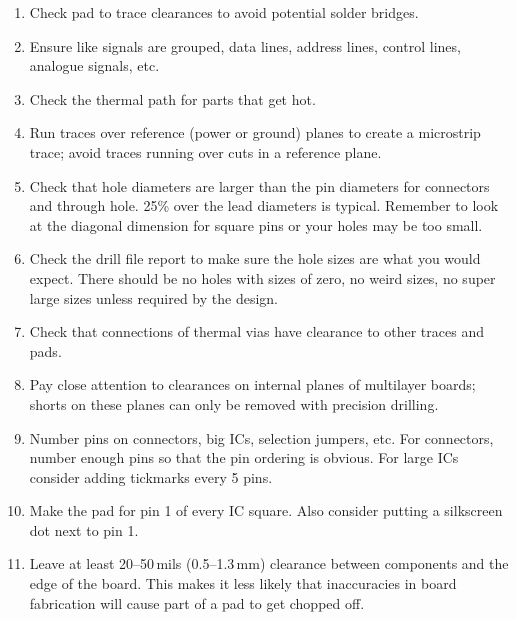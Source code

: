 \begin{enumerate}
\item Check pad to trace clearances to avoid potential solder bridges.


\item Ensure like signals are grouped, data lines, address lines, control lines, analogue signals, etc.

\item Check the thermal path for parts that get hot.

\item Run traces over reference (power or ground) planes to create a
  microstrip trace; avoid traces running over cuts in a reference
  plane.

\item Check that hole diameters are larger than the pin diameters for
  connectors and through hole. 25\% over the lead diameters is
  typical.  Remember to look at the diagonal dimension for square pins
  or your holes may be too small.

\item Check the drill file report to make sure the hole sizes are what
  you would expect. There should be no holes with sizes of zero, no
  weird sizes, no super large sizes unless required by the design.

\item Check that connections of thermal vias have clearance to other
  traces and pads.

\item Pay close attention to clearances on internal planes of
  multilayer boards; shorts on these planes can only be removed with
  precision drilling.

\item Number pins on connectors, big ICs, selection jumpers, etc. For
  connectors, number enough pins so that the pin ordering is
  obvious.  For large ICs consider adding tickmarks every 5 pins.

\item Make the pad for pin 1 of every IC square. Also consider putting
  a silkscreen dot next to pin 1.

\item Leave at least 20--50\,mils (0.5--1.3\,mm) clearance between
  components and the edge of the board. This makes it less likely that
  inaccuracies in board fabrication will cause part of a pad to get
  chopped off.


\end{enumerate}
